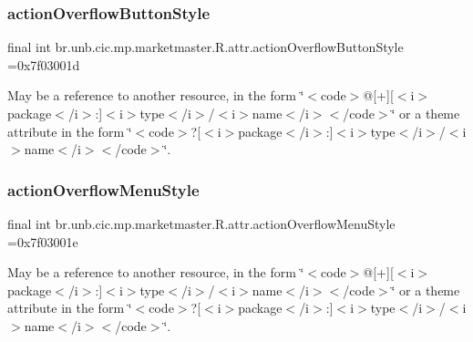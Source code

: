 \subsubsection{\texorpdfstring{action\+Overflow\+Button\+Style}{actionOverflowButtonStyle}}
{\footnotesize\ttfamily final int br.\+unb.\+cic.\+mp.\+marketmaster.\+R.\+attr.\+action\+Overflow\+Button\+Style =0x7f03001d\hspace{0.3cm}{\ttfamily [static]}}

May be a reference to another resource, in the form \char`\"{}$<$code$>$@\mbox{[}+\mbox{]}\mbox{[}$<$i$>$package$<$/i$>$\+:\mbox{]}$<$i$>$type$<$/i$>$/$<$i$>$name$<$/i$>$$<$/code$>$\char`\"{} or a theme attribute in the form \char`\"{}$<$code$>$?\mbox{[}$<$i$>$package$<$/i$>$\+:\mbox{]}$<$i$>$type$<$/i$>$/$<$i$>$name$<$/i$>$$<$/code$>$\char`\"{}. \mbox{\label{classbr_1_1unb_1_1cic_1_1mp_1_1marketmaster_1_1R_1_1attr_a375656d1d096859af50e2162bb71d20c}} 
\subsubsection{\texorpdfstring{action\+Overflow\+Menu\+Style}{actionOverflowMenuStyle}}
{\footnotesize\ttfamily final int br.\+unb.\+cic.\+mp.\+marketmaster.\+R.\+attr.\+action\+Overflow\+Menu\+Style =0x7f03001e\hspace{0.3cm}{\ttfamily [static]}}

May be a reference to another resource, in the form \char`\"{}$<$code$>$@\mbox{[}+\mbox{]}\mbox{[}$<$i$>$package$<$/i$>$\+:\mbox{]}$<$i$>$type$<$/i$>$/$<$i$>$name$<$/i$>$$<$/code$>$\char`\"{} or a theme attribute in the form \char`\"{}$<$code$>$?\mbox{[}$<$i$>$package$<$/i$>$\+:\mbox{]}$<$i$>$type$<$/i$>$/$<$i$>$name$<$/i$>$$<$/code$>$\char`\"{}. \mbox{\label{classbr_1_1unb_1_1cic_1_1mp_1_1marketmaster_1_1R_1_1attr_a81ecc80c1316b62e4fafe82898f085ee}} 
